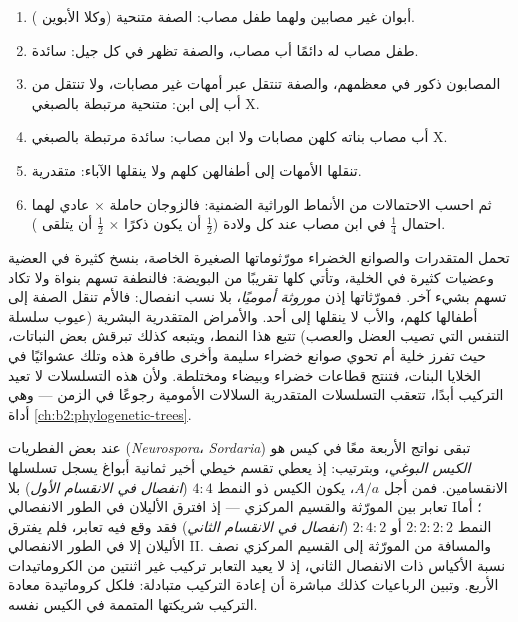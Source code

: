 \begin{method}\label{met:b2:meiosis-heredity:pedigree}
\begin{enumerate}
  \item أبوان غير مصابين ولهما طفل مصاب: الصفة متنحية (وكلا الأبوين
        ).
  \item طفل مصاب له دائمًا أب مصاب، والصفة تظهر في كل جيل: سائدة.
  \item المصابون ذكور في معظمهم، والصفة تنتقل عبر أمهات غير مصابات،
        ولا تنتقل من أب إلى ابن: متنحية مرتبطة بالصبغي X.
  \item أب مصاب بناته كلهن مصابات ولا ابن مصاب: سائدة مرتبطة
        بالصبغي X.
  \item تنقلها الأمهات إلى أطفالهن كلهم ولا ينقلها الآباء: متقدرية.
  \item ثم احسب الاحتمالات من الأنماط الوراثية الضمنية:
        فالزوجان حاملة $\times$ عادي لهما احتمال $\tfrac14$ في
        ابن مصاب عند كل ولادة ($\tfrac12$ أن يكون ذكرًا $\times$
        $\tfrac12$ أن يتلقى ).
\end{enumerate}
\end{method}

\begin{definition}\label{def:b2:meiosis-heredity:extranuclear}
تحمل المتقدرات والصوانع الخضراء مورّثوماتها الصغيرة الخاصة، بنسخ
كثيرة في العضية وعضيات كثيرة في الخلية، وتأتي كلها تقريبًا من
البويضة: فالنطفة تسهم بنواة ولا تكاد تسهم بشيء آخر. فمورّثاتها إذن
\emph{موروثة أموميًا}، بلا نسب انفصال: فالأم تنقل الصفة إلى
أطفالها كلهم، والأب لا ينقلها إلى أحد. والأمراض المتقدرية البشرية
(عيوب سلسلة التنفس التي تصيب العضل والعصب) تتبع هذا النمط، ويتبعه
كذلك تبرقش بعض النباتات، حيث تفرز خلية أم تحوي صوانع خضراء سليمة
وأخرى طافرة هذه وتلك عشوائيًا في الخلايا البنات، فتنتج قطاعات خضراء
وبيضاء ومختلطة. ولأن هذه التسلسلات لا تعيد التركيب أبدًا، تتعقب
التسلسلات المتقدرية السلالات الأمومية رجوعًا في الزمن --- وهي أداة
\cref{ch:b2:phylogenetic-trees}.
\end{definition}

\begin{proposition}\label{prop:b2:meiosis-heredity:tetrads}
عند بعض الفطريات (\emph{Neurospora}، \emph{Sordaria}) تبقى نواتج
 الأربعة معًا في كيس هو \emph{الكيس البوغي}، وبترتيب:
إذ يعطي تقسم خيطي أخير ثمانية أبواغ يسجل تسلسلها الانقسامين. فمن
أجل  $A/a$، يكون الكيس ذو النمط
$4 : 4$ (\emph{انفصال في الانقسام الأول}) بلا تعابر بين المورّثة
والقسيم المركزي --- إذ افترق الأليلان في الطور الانفصالي I؛ أما
النمط $2 : 2 : 2 : 2$ أو $2 : 4 : 2$ (\emph{انفصال في الانقسام
الثاني}) فقد وقع فيه تعابر، فلم يفترق الأليلان إلا في الطور
الانفصالي II. والمسافة من المورّثة إلى القسيم المركزي نصف نسبة
الأكياس ذات الانفصال الثاني، إذ لا يعيد التعابر تركيب غير اثنتين من
الكروماتيدات الأربع. وتبين الرباعيات كذلك مباشرة أن إعادة التركيب
متبادلة: فلكل كروماتيدة معادة التركيب شريكتها المتممة في الكيس نفسه.
\end{proposition}


